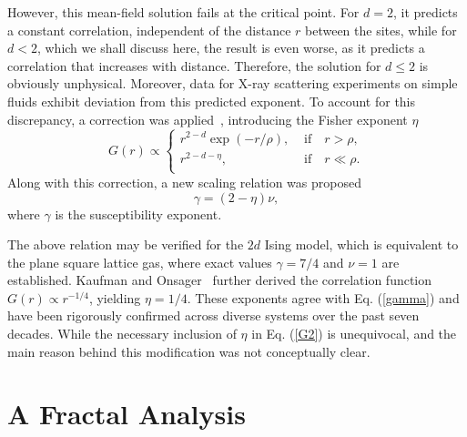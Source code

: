 \documentclass[pre,aps,twocolumn,showpacs,floatfix,nofootinbib,superscriptaddress,linenumbers]{revtex4-1}
\begin{document}
However, this mean-field solution fails at the critical point. For $d=2$, it predicts a constant correlation, independent of the distance $r$ between the sites, while for $d<2$, which we shall discuss here, the result is even worse, as it predicts a correlation that increases with distance. Therefore, the solution for $d \leq 2$ is obviously unphysical. Moreover, data for X-ray scattering experiments on simple fluids exhibit deviation from this predicted exponent\cite{Fisher64}. To account for this discrepancy, a correction was applied~\cite{Fisher64}, introducing the Fisher exponent $\eta$
\begin{equation}
\label{G2}
G(r) \propto
\begin{cases}
r^{2-d} \exp(-r/\rho) , &\text{ if~~ } r>\rho,\\
r^{2-d-\eta}, &\text{ if~~ }  r \ll\rho.\\
\end{cases}
\end{equation}
Along with this correction, a new scaling relation was proposed\cite{Fisher64}
\begin{equation}
\label{gamma}
\gamma =(2-\eta)\nu,
\end{equation}
where $\gamma$ is the susceptibility exponent. 
 
The above relation may be verified for the $2d$ Ising  model, which is equivalent to the plane square lattice gas, where exact values $\gamma=7/4$ and $\nu=1$ are established.  Kaufman and Onsager~\cite{Kaufman49} further derived the correlation function $G(r) \propto r^{-1/4} $, yielding $\eta=1/4$. These exponents agree with Eq. (\ref{gamma}) and have been rigorously confirmed across diverse systems over the past seven decades. While the necessary inclusion of $\eta$ in Eq. (\ref{G2}) is unequivocal, and the main reason behind this modification was not conceptually clear.

\section{ A Fractal Analysis }
\end{document}
